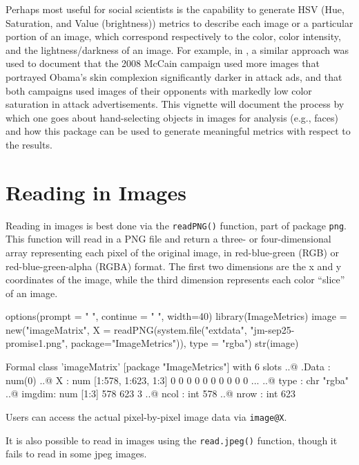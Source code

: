\documentclass[12pt]{article}
\begin{document}
Perhaps most useful for social scientists is the capability to generate HSV (Hue, Saturation, and Value (brightness)) metrics to describe each image or a particular portion of an image, which correspond respectively to the color, color intensity, and the lightness/darkness of an image.  For example, in \citet{messing2009Bias}, a similar approach was used to document that the 2008 McCain campaign used more images that portrayed Obama's skin complexion significantly darker in attack ads, and that both campaigns used images of their opponents with markedly low color saturation in attack advertisements.  This vignette will document the process by which one goes about hand-selecting objects in images for analysis (e.g., faces) and how this package can be used to generate meaningful metrics with respect to the results. 

\section{Reading in Images}
Reading in images is best done via the \texttt{readPNG()} function, part of package \texttt{png}.  This function will read in a PNG file and return a three- or four-dimensional array representing each pixel of the original image, in red-blue-green (RGB) or red-blue-green-alpha (RGBA) format.  The first two dimensions are the x and y coordinates of the image, while the third dimension represents each color ``slice'' of an image.       

\begin{Schunk}
\begin{Sinput}
 options(prompt = " ", continue = " ", width=40)
 library(ImageMetrics)
 image = new("imageMatrix", 
 		X = readPNG(system.file("extdata", "jm-sep25-promise1.png", 
 						package="ImageMetrics")), 
 		type = "rgba")
 str(image)
\end{Sinput}
\begin{Soutput}
Formal class 'imageMatrix' [package "ImageMetrics"] with 6 slots
  ..@ .Data : num(0) 
  ..@ X     : num [1:578, 1:623, 1:3] 0 0 0 0 0 0 0 0 0 0 ...
  ..@ type  : chr "rgba"
  ..@ imgdim: num [1:3] 578 623 3
  ..@ ncol  : int 578
  ..@ nrow  : int 623
\end{Soutput}
\end{Schunk}

Users can access the actual pixel-by-pixel image data via \texttt{image@X}.  

It is also possible to read in images using the \texttt{read.jpeg()} function, though it fails to read in some jpeg images.    
\end{document}
